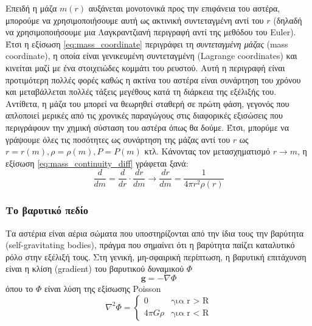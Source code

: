 Επειδή η μάζα $m(r)$ αυξάνεται μονοτονικά προς την επιφάνεια του αστέρα, μπορούμε να χρησιμοποιήσουμε αυτή ως ακτινική συντεταγμένη αντί του $r$ (δηλαδή να χρησιμοποιήσουμε μια Λαγκραντζιανή περιγραφή αντί της μεθόδου του Euler). Έτσι η εξίσωση \eqref{eq:mass_coordinate} περιγράφει τη \textit{συντεταγμένη μάζας} (mass coordinate), η οποία είναι γενικευμένη συντεταγμένη (Lagrange coordinates) και κινείται μαζί με ένα στοιχειώδες κομμάτι του ρευστού. Αυτή η περιγραφή είναι προτιμότερη πολλές φορές καθώς η ακτίνα του αστέρα είναι συνάρτηση του χρόνου και μεταβάλλεται πολλές τάξεις μεγέθους κατά τη διάρκεια της εξέλιξής του.
Αντίθετα, η μάζα του μπορεί να θεωρηθεί σταθερή σε πρώτη φάση, γεγονός που απλοποιεί μερικές από τις χρονικές παραγώγους στις διαφορικές εξισώσεις που περιγράφουν την χημική σύσταση του αστέρα όπως θα δούμε. Έτσι, μπορύμε να γράψουμε όλες τις ποσότητες ως συνάρτηση της μάζας αντί του $r$ ως $r = r(m), \rho = \rho(m), P = P(m)$ κτλ. Κάνοντας τον μετασχηματισμό $r \rightarrow m$, η εξίσωση \eqref{eq:mass_continuity_diff} γράφεται ξανά:
\begin{equation}
    \label{eq:mass_continuity_diff_dm}
    \frac{d}{dm} = \frac{d}{dr} \cdot \frac{dr}{dm}  \longrightarrow \boxed{\frac{dr}{dm} = \frac{1}{4\pi r^2 \rho (r)}}
\end{equation}
\subsubsection{Το βαρυτικό πεδίο}
Τα αστέρια είναι αέρια σώματα που υποστηρίζονται από την ίδια τους την βαρύτητα (self-gravitating bodies), πράγμα που σημαίνει ότι η βαρύτητα παίζει καταλυτικό ρόλο στην εξέλιξή τους. Στη γενική, μη-σφαιρική περίπτωση, η βαρυτική επιτάχυνση είναι η κλίση (gradient) του βαρυτικού δυναμικού $\Phi$
$$\boldsymbol{g} = - \nabla \Phi$$
όπου το $\Phi$ είναι λύση της εξίσωσης Poisson 
\begin{equation}
    \label{eq:poisson_equation}
    \nabla^2 \Phi = 
    \begin{cases}
        0 & \text{για r > R}\\
        4\pi G \rho & \text{για r < R}
    \end{cases}
\end{equation}

